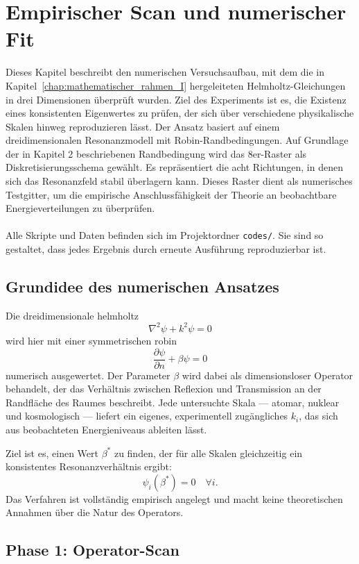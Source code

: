 \chapter{Empirischer Scan und numerischer Fit}
\label{chap:empirischer_fit}

Dieses Kapitel beschreibt den numerischen Versuchsaufbau, mit dem die in Kapitel~\ref{chap:mathematischer_rahmen_I}
hergeleiteten Helmholtz-Gleichungen in drei Dimensionen überprüft wurden.  
Ziel des Experiments ist es, die Existenz eines konsistenten Eigenwertes
zu prüfen, der sich über verschiedene physikalische Skalen hinweg reproduzieren lässt.
Der Ansatz basiert auf einem dreidimensionalen Resonanzmodell mit Robin-Randbedingungen. Auf Grundlage der in Kapitel 2 beschriebenen Randbedingung
wird das 8er-Raster als Diskretisierungsschema gewählt. Es repräsentiert die acht Richtungen, in denen sich das Resonanzfeld stabil überlagern kann. Dieses Raster dient als numerisches Testgitter, um die empirische Anschlussfähigkeit der Theorie an beobachtbare Energieverteilungen zu überprüfen.
\\
\\
Alle Skripte und Daten befinden sich im Projektordner \texttt{codes/}.  
Sie sind so gestaltet, dass jedes Ergebnis durch erneute Ausführung reproduzierbar ist.

\section{Grundidee des numerischen Ansatzes}

Die dreidimensionale \gls{helmholtz}
\[
  \nabla^2 \psi + k^2 \psi = 0
\]
wird hier mit einer symmetrischen \gls{robin}
\[
  \frac{\partial \psi}{\partial n} + \beta \psi = 0
\]
numerisch ausgewertet.  
Der Parameter $\beta$ wird dabei als dimensionsloser Operator behandelt, der das
Verhältnis zwischen Reflexion und Transmission an der Randfläche des Raumes beschreibt.
Jede untersuchte Skala — atomar, nuklear und kosmologisch — liefert ein eigenes,
experimentell zugängliches $k_i$, das sich aus beobachteten Energieniveaus ableiten lässt.

Ziel ist es, einen Wert $\beta^*$ zu finden, der für alle Skalen gleichzeitig
ein konsistentes Resonanzverhältnis ergibt:
\[
  \psi_i(\beta^*) = 0 \quad \forall i.
\]
Das Verfahren ist vollständig empirisch angelegt und macht keine theoretischen
Annahmen über die Natur des Operators.
\\
\newpage
\section{Phase 1: Operator-Scan}
\label{sec:scan}

